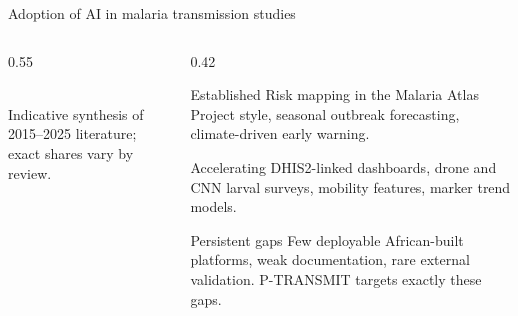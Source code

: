 \documentclass[aspectratio=169,11pt]{beamer}
\begin{document}
\begin{frame}{Adoption of AI in malaria transmission studies}
  \begin{columns}[c]
    \begin{column}{0.55\textwidth}
      \centering
      \\
      {\scriptsize\textcolor{slate}{Indicative synthesis of 2015--2025 literature; exact shares vary by review.}}
    \end{column}
    \begin{column}{0.42\textwidth}
      \begin{block}{Established}
        Risk mapping in the Malaria Atlas Project style, seasonal outbreak
        forecasting, climate-driven early warning.
      \end{block}
      \begin{alertblock}{Accelerating}
        DHIS2-linked dashboards, drone and CNN larval surveys, mobility
        features, marker trend models.
      \end{alertblock}
      \begin{block}{Persistent gaps}
        Few deployable African-built platforms, weak documentation, rare
        external validation. P-TRANSMIT targets exactly these gaps.
      \end{block}
    \end{column}
  \end{columns}
\end{frame}
\end{document}
